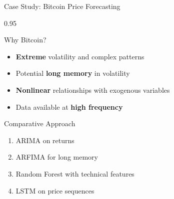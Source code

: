 \documentclass[9pt, aspectratio=169, t]{beamer}
\begin{document}
\begin{frame}{Case Study: Bitcoin Price Forecasting}
    \begin{cminipage}{0.95\textwidth}
    \begin{block}{Why Bitcoin?}
        \begin{itemize}\setlength{\itemsep}{0pt}
            \item \textbf{Extreme} volatility and complex patterns
            \item Potential \textbf{long memory} in volatility
            \item \textbf{Nonlinear} relationships with exogenous variables
            \item Data available at \textbf{high frequency}
        \end{itemize}
    \end{block}
    \vspace{0.1cm}
    \begin{exampleblock}{Comparative Approach}
        \begin{enumerate}\setlength{\itemsep}{0pt}
            \item ARIMA on returns
            \item ARFIMA for long memory
            \item Random Forest with technical features
            \item LSTM on price sequences
        \end{enumerate}
    \end{exampleblock}
    \end{cminipage}
\end{frame}
\end{document}
